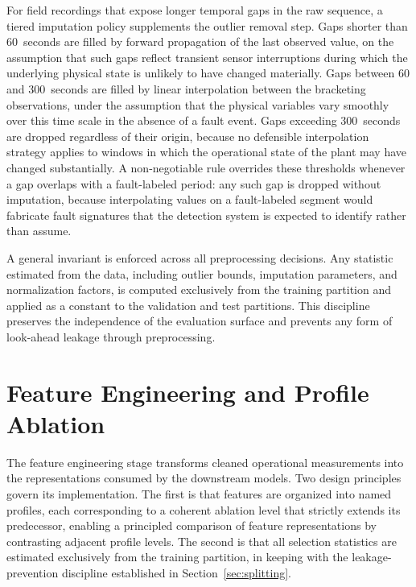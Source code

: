 For field recordings that expose longer temporal gaps in the raw sequence, a tiered imputation policy supplements the outlier removal step. Gaps shorter than 60~seconds are filled by forward propagation of the last observed value, on the assumption that such gaps reflect transient sensor interruptions during which the underlying physical state is unlikely to have changed materially. Gaps between 60 and 300~seconds are filled by linear interpolation between the bracketing observations, under the assumption that the physical variables vary smoothly over this time scale in the absence of a fault event. Gaps exceeding 300~seconds are dropped regardless of their origin, because no defensible interpolation strategy applies to windows in which the operational state of the plant may have changed substantially. A non-negotiable rule overrides these thresholds whenever a gap overlaps with a fault-labeled period: any such gap is dropped without imputation, because interpolating values on a fault-labeled segment would fabricate fault signatures that the detection system is expected to identify rather than assume.

A general invariant is enforced across all preprocessing decisions. Any statistic estimated from the data, including outlier bounds, imputation parameters, and normalization factors, is computed exclusively from the training partition and applied as a constant to the validation and test partitions. This discipline preserves the independence of the evaluation surface and prevents any form of look-ahead leakage through preprocessing.

\section{Feature Engineering and Profile Ablation}
\label{sec:feature-engineering}

The feature engineering stage transforms cleaned operational measurements into the representations consumed by the downstream models. Two design principles govern its implementation. The first is that features are organized into named profiles, each corresponding to a coherent ablation level that strictly extends its predecessor, enabling a principled comparison of feature representations by contrasting adjacent profile levels. The second is that all selection statistics are estimated exclusively from the training partition, in keeping with the leakage-prevention discipline established in Section~\ref{sec:splitting}.

